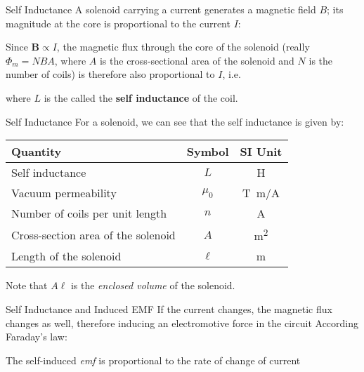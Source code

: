 \documentclass[12pt,aspectratio=169]{beamer}
\newcommand{\eq}[2]{\vspace{#1}{\Large\begin{displaymath}#2\end{displaymath}}}
\begin{document}
\begin{frame}{Self Inductance}
  A solenoid carrying a current generates a magnetic field $B$; its magnitude at
  the core is proportional to the current $I$:

  \eq{-.2in}{
    B=\left[\frac{\mu_0N}\ell\right]I
  }

  Since $\bm{B}\propto I$, the magnetic flux through the core of the solenoid
  (really $\Phi_m=NBA$, where $A$ is the cross-sectional area of the solenoid
  and $N$ is the number of coils) is therefore also proportional to $I$, i.e.

  \eq{-.2in}{
    \boxed{\Phi_m=LI}
  }

  where $L$ is the called the \textbf{self inductance} of the coil.
\end{frame}



\begin{frame}{Self Inductance}
  For a solenoid, we can see that the self inductance is given by:

  \eq{-.2in}{
    \boxed{L=\frac{\Phi_m}{I}=\mu_0 n^2A\ell}
  }

  \begin{center}
    \begin{tabular}{l|c|c}
      \rowcolor{pink}
      \textbf{Quantity} & \textbf{Symbol} & \textbf{SI Unit} \\ \hline
      Self inductance                    & $L$     & \si{\henry}\\
      Vacuum permeability                & $\mu_0$ & \si{T.m/A} \\
      Number of coils per unit length    & $n$     & \si{\ampere} \\
      Cross-section area of the solenoid & $A$     & \si{\metre^2} \\
      Length of the solenoid             & $\ell$  & \si{\metre}
    \end{tabular}
  \end{center}
  Note that $A\ell$ is the \emph{enclosed volume} of the solenoid.
\end{frame}



\begin{frame}{Self Inductance and Induced EMF}
  If the current changes, the magnetic flux changes as well, therefore inducing
  an electromotive force in the circuit According Faraday's law:

  \eq{-.1in}{
    \boxed{\mathcal{E}=-\diff {\Phi_m}t=-L\diff It}
  }

  The self-induced \emph{emf} is proportional to the rate of change of current
\end{frame}
\end{document}
